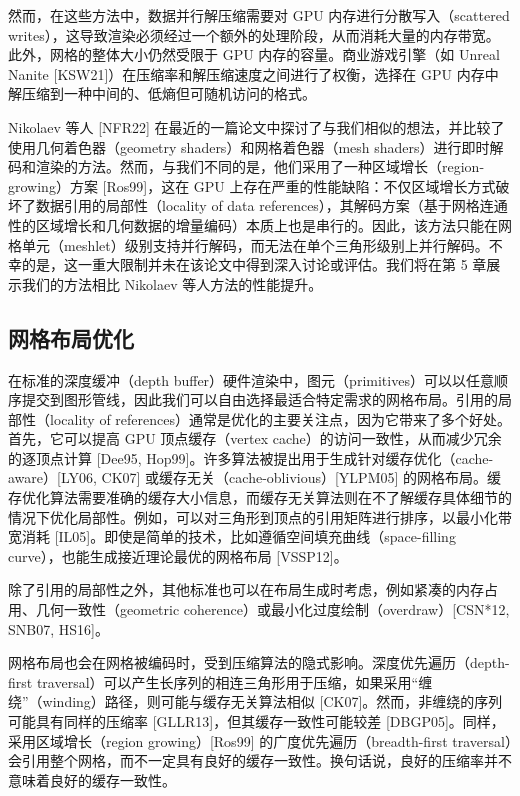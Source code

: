然而，在这些方法中，数据并行解压缩需要对 GPU 内存进行分散写入（scattered writes），这导致渲染必须经过一个额外的处理阶段，从而消耗大量的内存带宽。此外，网格的整体大小仍然受限于 GPU 内存的容量。商业游戏引擎（如 Unreal Nanite [KSW21]）在压缩率和解压缩速度之间进行了权衡，选择在 GPU 内存中解压缩到一种中间的、低熵但可随机访问的格式。

Nikolaev 等人 [NFR22] 在最近的一篇论文中探讨了与我们相似的想法，并比较了使用几何着色器（geometry shaders）和网格着色器（mesh shaders）进行即时解码和渲染的方法。然而，与我们不同的是，他们采用了一种区域增长（region-growing）方案 [Ros99]，这在 GPU 上存在严重的性能缺陷：不仅区域增长方式破坏了数据引用的局部性（locality of data references），其解码方案（基于网格连通性的区域增长和几何数据的增量编码）本质上也是串行的。因此，该方法只能在网格单元（meshlet）级别支持并行解码，而无法在单个三角形级别上并行解码。不幸的是，这一重大限制并未在该论文中得到深入讨论或评估。我们将在第 5 章展示我们的方法相比 Nikolaev 等人方法的性能提升。

\subsection{网格布局优化}

在标准的深度缓冲（depth buffer）硬件渲染中，图元（primitives）可以以任意顺序提交到图形管线，因此我们可以自由选择最适合特定需求的网格布局。引用的局部性（locality of references）通常是优化的主要关注点，因为它带来了多个好处。首先，它可以提高 GPU 顶点缓存（vertex cache）的访问一致性，从而减少冗余的逐顶点计算 [Dee95, Hop99]。许多算法被提出用于生成针对缓存优化（cache-aware）[LY06, CK07] 或缓存无关（cache-oblivious）[YLPM05] 的网格布局。缓存优化算法需要准确的缓存大小信息，而缓存无关算法则在不了解缓存具体细节的情况下优化局部性。例如，可以对三角形到顶点的引用矩阵进行排序，以最小化带宽消耗 [IL05]。即使是简单的技术，比如遵循空间填充曲线（space-filling curve），也能生成接近理论最优的网格布局 [VSSP12]。

除了引用的局部性之外，其他标准也可以在布局生成时考虑，例如紧凑的内存占用、几何一致性（geometric coherence）或最小化过度绘制（overdraw）[CSN*12, SNB07, HS16]。

网格布局也会在网格被编码时，受到压缩算法的隐式影响。深度优先遍历（depth-first traversal）可以产生长序列的相连三角形用于压缩，如果采用“缠绕”（winding）路径，则可能与缓存无关算法相似 [CK07]。然而，非缠绕的序列可能具有同样的压缩率 [GLLR13]，但其缓存一致性可能较差 [DBGP05]。同样，采用区域增长（region growing）[Ros99] 的广度优先遍历（breadth-first traversal）会引用整个网格，而不一定具有良好的缓存一致性。换句话说，良好的压缩率并不意味着良好的缓存一致性。

